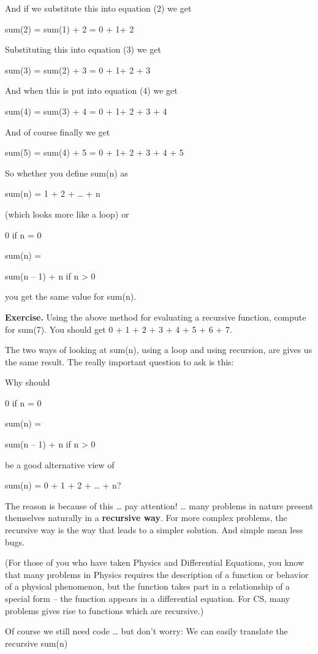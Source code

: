 \documentclass[
]{article}
\begin{document}
And if we substitute this into equation (2) we get

sum(2) = sum(1) + 2 = 0 + 1+ 2

Substituting this into equation (3) we get

sum(3) = sum(2) + 3 = 0 + 1+ 2 + 3

And when this is put into equation (4) we get

sum(4) = sum(3) + 4 = 0 + 1+ 2 + 3 + 4

And of course finally we get

sum(5) = sum(4) + 5 = 0 + 1+ 2 + 3 + 4 + 5

So whether you define sum(n) as

sum(n) = 1 + 2 + \ldots{} + n

(which looks more like a loop) or

0 if n = 0

sum(n) =

sum(n -- 1) + n if n \textgreater{} 0

\hfill\break
you get the same value for sum(n).

\textbf{Exercise.} Using the above method for evaluating a recursive
function, compute for sum(7). You should get 0 + 1 + 2 + 3 + 4 + 5 + 6 +
7.

The two ways of looking at sum(n), using a loop and using recursion, are
gives us the same result. The really important question to ask is this:

Why should

0 if n = 0

sum(n) =

sum(n -- 1) + n if n \textgreater{} 0

be a good alternative view of

sum(n) = 0 + 1 + 2 + \ldots{} + n?

The reason is because of this \ldots{} pay attention! \ldots{} many
problems in nature present themselves naturally in a \textbf{recursive
way}. For more complex problems, the recursive way is the way that leads
to a simpler solution. And simple mean less bugs.

(For those of you who have taken Physics and Differential Equations, you
know that many problems in Physics requires the description of a
function or behavior of a physical phenomenon, but the function takes
part in a relationship of a special form -- the function appears in a
differential equation. For CS, many problems gives rise to functions
which are recursive.)

Of course we still need code \ldots{} but don't worry: We can easily
translate the recursive sum(n)
\end{document}
